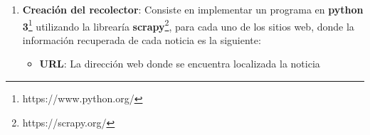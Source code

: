 \begin{enumerate}
  Una expresión \textit{XPath} de ruta permite buscar y seleccionar los distintos nodos de un documento XML. En el  Cuadro \ref{box:xml} se muestra un ejemplo con los elementos de una nota, los cuales son: \textbf{para}, \textbf{de}, \textbf{titulo}, \textbf{texto}, estos son los nodos que conforman una nota.\\


\begin{mygraybox}[label={box:xml}]{XML} 

\begin{tabbing}
<nota> \= \\\kill
\>  <para>Daniel</para>\\
\>  <de>Andres</de>\\
\>  <titulo>Recordatorio</titulo>\\
\>  <texto>Despertar temprano.</texto>\\
</nota>
\end{tabbing}

\end{mygraybox}
\ \\ 
La expresión \textit{XPath} que permite extraer el contenido de la etiqueta \textbf{<texto> </texto>} se muestra en el Cuadro \ref{box:xpathEjemplo} y el Cuadro \ref{box:xpathTexto} muestra el contenido obtenido: \\

\begin{mygraybox}[label={box:xpathEjemplo}]{Expresión XPath} 
\textbf{/nota/texto/text()}
\end{mygraybox}

\begin{mygraybox}[label={box:xpathTexto}]{Texto} 
\textbf{Despertar temprano.}
\end{mygraybox}
\ \\

  \item \textbf{Creación del recolector}: Consiste en implementar un programa en \textbf{python 3}\footnote{https://www.python.org/} utilizando la librearía  \textbf{scrapy}\footnote{https://scrapy.org/}, para cada uno de los sitios web, donde la información recuperada de cada noticia es la siguiente:\\

  \begin{itemize}
  
  \item \textbf{URL}: La dirección web donde se encuentra localizada la noticia \\
  

\end{itemize}
\end{enumerate}
